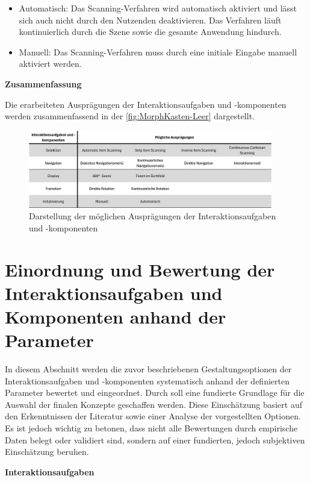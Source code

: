 \begin{itemize}
    \item Automatisch: Das Scanning-Verfahren wird automatisch aktiviert und lässt sich auch nicht durch den Nutzenden deaktivieren. Das Verfahren läuft kontinuierlich durch die Szene sowie die gesamte Anwendung hindurch.
    \item Manuell: Das Scanning-Verfahren muss durch eine initiale Eingabe manuell aktiviert werden. 
\end{itemize}

{\normalfont \bfseries Zusammenfassung}

Die erarbeiteten Ausprägungen der Interaktionsaufgaben und -komponenten werden zusammenfassend in der \autoref{fig:MorphKasten-Leer} dargestellt. 

\begin{figure}[tbh]
    \centering
    \includegraphics[width=0.95\textwidth]{images/MorphKasten-Ausgang2.png}
    \caption{Darstellung der möglichen Ausprägungen der Interaktionsaufgaben und -komponenten}
    \label{fig:MorphKasten-Leer}
\end{figure}

\section{Einordnung und Bewertung der Interaktionsaufgaben und Komponenten anhand der Parameter}
\label{subchap:EinordnungNachParameter}

In diesem Abschnitt werden die zuvor beschriebenen Gestaltungsoptionen der Interaktionsaufgaben und -komponenten systematisch anhand der definierten Parameter bewertet und eingeordnet. Durch soll eine fundierte Grundlage für die Auswahl der finalen Konzepte geschaffen werden. Diese Einschätzung basiert auf den Erkenntnissen der Literatur sowie einer Analyse der vorgestellten Optionen. Es ist jedoch wichtig zu betonen, dass nicht alle Bewertungen durch empirische Daten belegt oder validiert sind, sondern auf einer fundierten, jedoch subjektiven Einschätzung beruhen. 

{\normalfont \bfseries Interaktionsaufgaben}  

